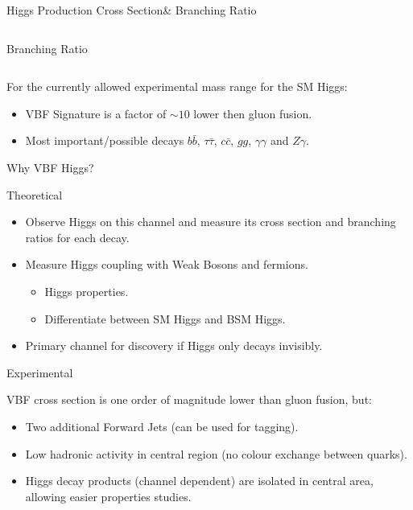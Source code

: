 \documentclass[8pt]{beamer}
\begin{document}
\begin{frame}{Higgs Production Cross Section\& Branching Ratio}
\begin{columns}
\begin{block}{Branching Ratio}
  \end{block}

\end{columns}

  \begin{block}

For the currently allowed experimental mass range for the SM Higgs:
\begin{itemize}
  \item VBF Signature is a factor of $\sim10$ lower then gluon fusion.
  \item Most important/possible decays $b\bar{b}$, $\tau\bar{\tau}$, $c\bar{c}$, $gg$, $\gamma\gamma$ and $Z\gamma$. 
\end{itemize}

  \end{block}

\end{frame}

\begin{frame}{Why VBF Higgs?}

\begin{block}{Theoretical}

  \begin{itemize}
    \item Observe Higgs on this channel and measure its cross section and branching ratios for each decay.
    \item Measure Higgs coupling with Weak Bosons and fermions.
    \begin{itemize}
      \item Higgs properties.
      \item Differentiate between SM Higgs and BSM Higgs.
    \end{itemize}
    \item Primary channel for discovery if Higgs only decays invisibly.
  \end{itemize}

\end{block} 

\begin{block}{Experimental}

  VBF cross section is one order of magnitude lower than gluon fusion, but: 
  \begin{itemize}
    \item Two additional Forward Jets (can be used for tagging).
    \item Low hadronic activity in central region (no colour exchange between quarks).
    \item Higgs decay products (channel dependent) are isolated in central area, allowing easier properties studies.
  \end{itemize}

\end{block} 

\end{frame}
\end{document}
